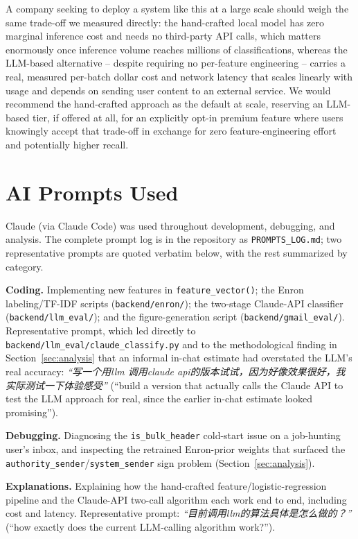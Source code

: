 \documentclass[twoside,twocolumn,10pt]{article}
\begin{document}
A company seeking to deploy a system like this at a large scale should weigh the same trade-off we measured directly: the hand-crafted local model has zero marginal inference cost and needs no third-party API calls, which matters enormously once inference volume reaches millions of classifications, whereas the LLM-based alternative -- despite requiring no per-feature engineering -- carries a real, measured per-batch dollar cost and network latency that scales linearly with usage and depends on sending user content to an external service. We would recommend the hand-crafted approach as the default at scale, reserving an LLM-based tier, if offered at all, for an explicitly opt-in premium feature where users knowingly accept that trade-off in exchange for zero feature-engineering effort and potentially higher recall.

\section{AI Prompts Used}

Claude (via Claude Code) was used throughout development, debugging, and analysis. The complete prompt log is in the repository as \texttt{PROMPTS\_LOG.md}; two representative prompts are quoted verbatim below, with the rest summarized by category.

\textbf{Coding.} Implementing new features in \texttt{feature\_vector()}; the Enron labeling/TF-IDF scripts (\texttt{backend/enron/}); the two-stage Claude-API classifier (\texttt{backend/llm\_eval/}); and the figure-generation script (\texttt{backend/gmail\_eval/}). Representative prompt, which led directly to \texttt{backend/llm\_eval/claude\_classify.py} and to the methodological finding in Section~\ref{sec:analysis} that an informal in-chat estimate had overstated the LLM's real accuracy: \textit{``写一个用llm 调用claude api的版本试试，因为好像效果很好，我实际测试一下体验感受''} (``build a version that actually calls the Claude API to test the LLM approach for real, since the earlier in-chat estimate looked promising'').

\textbf{Debugging.} Diagnosing the \texttt{is\_bulk\_header} cold-start issue on a job-hunting user's inbox, and inspecting the retrained Enron-prior weights that surfaced the \texttt{authority\_sender}/\texttt{system\_sender} sign problem (Section~\ref{sec:analysis}).

\textbf{Explanations.} Explaining how the hand-crafted feature/logistic-regression pipeline and the Claude-API two-call algorithm each work end to end, including cost and latency. Representative prompt: \textit{``目前调用llm的算法具体是怎么做的？''} (``how exactly does the current LLM-calling algorithm work?'').
\end{document}
